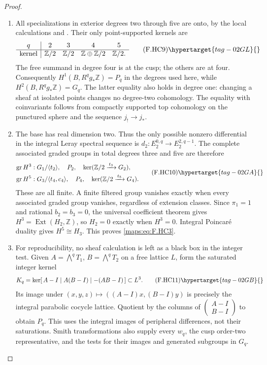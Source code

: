 \begin{proof}
\begin{enumerate}[label={$\langle1\rangle$\arabic*.}]
\item All specializations in exterior degrees two through
five are onto, by the local calculations and .
Their only point-supported kernels are
\[
\begin{array}{c|cccc}
q&2&3&4&5\\ \hline
\text{kernel}&\mathbb Z/2&\mathbb Z/2&
                 \mathbb Z\oplus\mathbb Z/2&\mathbb Z/2 .
\end{array}
\tag{F.HC9}\hypertarget{tag-02GL}{}\label{maps:eq:F.HC9}
\]
The free summand in degree four is at the cusp; the
others are at four.
Consequently $H^1(B,R^qg_*\mathbb Z)=P_q$ in the
degrees used here, while
$H^2(B,R^qg_*\mathbb Z)=G_q$.
The latter equality also holds in degree one:
changing a sheaf at isolated points changes no
degree-two cohomology.  The equality with coinvariants
follows from compactly supported top cohomology on
the punctured sphere and the sequence $j_!\to j_*$.

\item The base has real dimension two.
Thus the only possible nonzero differential in the
integral Leray spectral sequence is
$d_2:E_2^{0,q}\to E_2^{2,q-1}$.
The complete associated graded groups in total
degrees three and five are therefore
\[
\begin{split}
 \operatorname{gr}H^3&:
   G_1/\langle t_2\rangle,\quad P_2,\quad
   \ker(\mathbb Z/2\xrightarrow{\,t_3\,}G_2),\\
 \operatorname{gr}H^5&:
   G_3/\langle t_4,c_4\rangle,\quad P_4,\quad
   \ker(\mathbb Z/2\xrightarrow{\,t_5\,}G_4).
\end{split}
\tag{F.HC10}\hypertarget{tag-02GA}{}\label{maps:eq:F.HC10}
\]
These are all finite.  A finite filtered group
vanishes exactly when every associated graded group
vanishes, regardless of extension classes.
Since $\pi_1=1$ and rational $b_2=b_3=0$, the universal
coefficient theorem gives
$H^3=\operatorname{Ext}(H_2,\mathbb Z)$, so
$H_2=0$ exactly when $H^3=0$.
Integral Poincar\'e duality gives $H^5\cong H_3$.
This proves \eqref{maps:eq:F.HC3}.

\item For reproducibility, no sheaf calculation is left
as a black box in the integer test.
Given $A=\bigwedge^qT_1$, $B=\bigwedge^qT_2$ on a
free lattice $L$, form the saturated integer kernel
\[
 K_q=\ker[\,A-I\mid A(B-I)\mid -(AB-I)\,]\subset L^3.
 \tag{F.HC11}\hypertarget{tag-02GB}{}\label{maps:eq:F.HC11}
\]
Its image under
$(x,y,z)\mapsto((A-I)x,(B-I)y)$ is precisely the
integral parabolic cocycle lattice.
Quotient by the columns of
$\left(\begin{smallmatrix}A-I\\B-I\end{smallmatrix}\right)$
to obtain $P_q$.
This uses the integral images of peripheral
differences, not their saturations.
Smith transformations also supply every $w_q$, the
cusp order-two representative, and the tests for
their images and generated subgroups in $G_q$.


\end{enumerate}
\end{proof}
